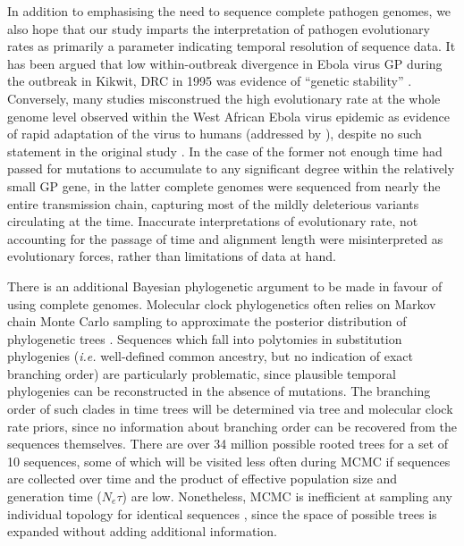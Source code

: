 \documentclass[11pt,oneside,letterpaper]{article}
\begin{document}
In addition to emphasising the need to sequence complete pathogen genomes, we also hope that our study imparts the interpretation of pathogen evolutionary rates as primarily a parameter indicating temporal resolution of sequence data.
It has been argued that low within-outbreak divergence in Ebola virus GP during the outbreak in Kikwit, DRC in 1995 was evidence of ``genetic stability'' \citep{rodriguez_persistence_1999}.
Conversely, many studies misconstrued the high evolutionary rate at the whole genome level observed within the West African Ebola virus epidemic as evidence of rapid adaptation of the virus to humans (addressed by \cite{holmes_evolution_2016,rambaut_comment_2016}), despite no such statement in the original study \citep{gire_genomic_2014}.
In the case of the former not enough time had passed for mutations to accumulate to any significant degree within the relatively small GP gene, in the latter complete genomes were sequenced from nearly the entire transmission chain, capturing most of the mildly deleterious variants circulating at the time.
Inaccurate interpretations of evolutionary rate, not accounting for the passage of time and alignment length were misinterpreted as evolutionary forces, rather than limitations of data at hand.

There is an additional Bayesian phylogenetic argument to be made in favour of using complete genomes.
Molecular clock phylogenetics often relies on Markov chain Monte Carlo sampling to approximate the posterior distribution of phylogenetic trees \citep{yang_bayesian_1997}.
Sequences which fall into polytomies in substitution phylogenies (\textit{i.e.} well-defined common ancestry, but no indication of exact branching order) are particularly problematic, since plausible temporal phylogenies can be reconstructed in the absence of mutations.
The branching order of such clades in time trees will be determined via tree and molecular clock rate priors, since no information about branching order can be recovered from the sequences themselves.
There are over 34 million possible rooted trees for a set of 10 sequences, some of which will be visited less often during MCMC if sequences are collected over time and the product of effective population size and generation time ($N_{e}\tau$) are low.
Nonetheless, MCMC is inefficient at sampling any individual topology for identical sequences \citep{whidden_quantifying_2015}, since the space of possible trees is expanded without adding additional information.
\end{document}
